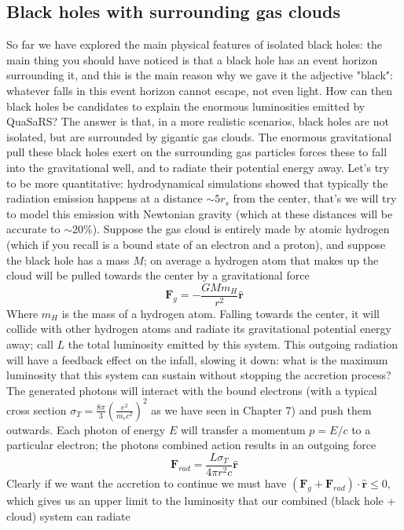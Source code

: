 \documentclass[11pt, a4paper,oneside,openright]{book}
\numberwithin{equation}{section}
\begin{document}
\subsection{Black holes with surrounding gas clouds}  
So far we have explored the main physical features of isolated black holes: the main thing you should have noticed is that a black hole has an event horizon surrounding it, and this is the main reason why we gave it the adjective "black": whatever falls in this event horizon cannot escape, not even light. How can then black holes be candidates to explain the enormous luminosities emitted by QuaSaRS? The answer is that, in a more realistic scenarios, black holes are not isolated, but are surrounded by gigantic gas clouds. The enormous gravitational pull these black holes exert on the surrounding gas particles forces these to fall into the gravitational well, and to radiate their potential energy away. Let's try to be more quantitative: hydrodynamical simulations showed that typically the radiation emission happens at a distance $\sim 5r_s$ from the center, that's we will try to model this emission with Newtonian gravity (which at these distances will be accurate to $\sim 20\%$). Suppose the gas cloud is entirely made by atomic hydrogen (which if you recall is a bound state of an electron and a proton), and suppose the black hole has a mass $M$; on average a hydrogen atom that makes up the cloud will be pulled towards the center by a gravitational force
\begin{equation}
\mathbf{F}_g = -\frac{GMm_H}{r^2}\hat{\mathbf{r}}
\end{equation}
Where $m_H$ is the mass of a hydrogen atom. Falling towards the center, it will collide with other hydrogen atoms and radiate its gravitational potential energy away; call $L$ the total luminosity emitted by this system. This outgoing radiation will have a feedback effect on the infall, slowing it down: what is the maximum luminosity that this system can sustain without stopping the accretion process? The generated photons will interact with the bound electrons (with a typical cross section $\sigma_T=\frac{8\pi}{3}\left(\frac{e^2}{m_ec^2}\right)^2$ as we have seen in Chapter 7) and push them outwards. Each photon of energy $E$ will transfer a momentum $p=E/c$ to a particular electron; the photons combined action results in an outgoing force
\begin{equation}
\mathbf{F}_{rad}=\frac{L\sigma_T}{4\pi r^2 c}\hat{\mathbf{r}}
\end{equation}
Clearly if we want the accretion to continue we must have $(\mathbf{F}_g+\mathbf{F}_{rad})\cdot \hat{\mathbf{r}}\leq0$, which gives us an upper limit to the luminosity that our combined (black hole + cloud) system can radiate
\end{document}
